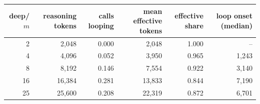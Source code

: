 \begin{tabular}{rrrrrr}
\toprule
deep/$m$ & reasoning tokens & calls looping & mean effective tokens & effective share & loop onset (median) \\ \midrule
2 & 2,048 & 0.000 & 2,048 & 1.000 & -- \\
4 & 4,096 & 0.052 & 3,950 & 0.965 & 1,243 \\
8 & 8,192 & 0.146 & 7,554 & 0.922 & 3,140 \\
16 & 16,384 & 0.281 & 13,833 & 0.844 & 7,190 \\
25 & 25,600 & 0.208 & 22,319 & 0.872 & 6,701 \\
\bottomrule
\end{tabular}

